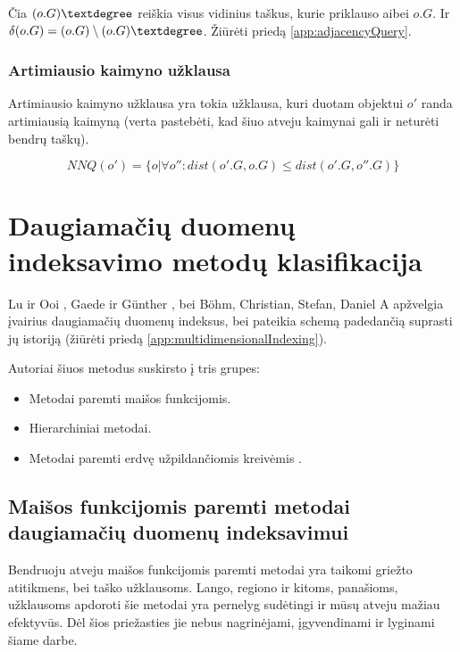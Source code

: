 Čia $(o.G)\textdegree$ reiškia visus vidinius taškus, kurie priklauso aibei $o.G$.
Ir $\delta(o.G)=(o.G) \setminus (o.G)\textdegree$.
Žiūrėti priedą \ref{app:adjacencyQuery}.


\subsubsection{Artimiausio kaimyno užklausa}
Artimiausio kaimyno užklausa yra tokia užklausa, kuri duotam objektui $o'$ randa artimiausią kaimyną (verta pastebėti, kad šiuo atveju kaimynai gali ir neturėti bendrų taškų).

\begin{equation}
	NNQ(o') = \{ o | \forall o'' : dist(o'.G, o.G) \leq dist(o'.G, o''.G) \}
\label{eq:ExactMatchQuery}
\end{equation}




\section{Daugiamačių duomenų indeksavimo metodų klasifikacija}
Lu ir Ooi \cite{lu1993spatial}, Gaede ir Günther \cite{gaede1998multidimensional}, bei B{\"o}hm, Christian, Stefan, Daniel A \cite{bohm2001searching} apžvelgia įvairius daugiamačių duomenų indeksus, bei pateikia schemą padedančią suprasti jų istoriją (žiūrėti priedą \ref{app:multidimensionalIndexing}).

Autoriai šiuos metodus suskirsto į tris grupes:
\begin{itemize}
	\item Metodai paremti maišos funkcijomis.
	\item Hierarchiniai metodai.
	\item Metodai paremti erdvę užpildančiomis kreivėmis \cite{bader2012space}.
\end{itemize}



\subsection{Maišos funkcijomis paremti metodai daugiamačių duomenų indeksavimui}

Bendruoju atveju maišos funkcijomis paremti metodai yra taikomi griežto atitikmens, bei taško užklausoms.
Lango, regiono ir kitoms, panašioms, užklausoms apdoroti šie metodai yra pernelyg sudėtingi \cite{nievergelt1981grid} \cite{tamminen1982excell} ir mūsų atveju mažiau efektyvūs.
Dėl šios priežasties jie nebus nagrinėjami, įgyvendinami ir lyginami šiame darbe.


